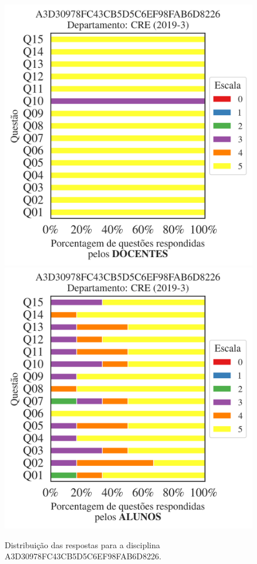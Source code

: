 \documentclass[a4paper,10pt]{article}
\begin{document}
\begin{figure}[h]
\centering
\includegraphics[width=0.485\linewidth]{analise_disciplina_departamento_CRE_A3D30978FC43CB5D5C6EF98FAB6D8226_docentes.png}
\includegraphics[width=0.485\linewidth]{analise_disciplina_departamento_CRE_A3D30978FC43CB5D5C6EF98FAB6D8226_alunos.png}
\caption{\label{fig:analise_geral_departamento}                Distribuição das respostas para a disciplina A3D30978FC43CB5D5C6EF98FAB6D8226. }
\end{figure}
\end{document}
